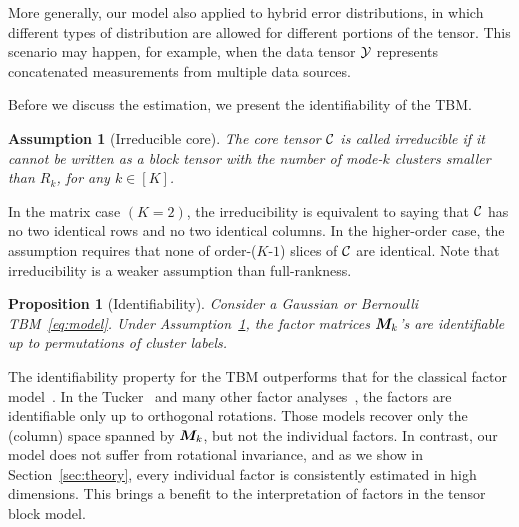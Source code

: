 \documentclass{article}
\newtheorem{prop}{Proposition}
\newtheorem{ass}{Assumption}
\begin{document}
More generally, our model also applied to hybrid error distributions, in which different types of distribution are allowed for different portions of the tensor. This scenario may happen, for example, when the data tensor $\mathcal{Y}$ represents concatenated measurements from multiple data sources. 

Before we discuss the estimation, we present the identifiability of the TBM. 

\begin{ass}[Irreducible core]\label{ass:core}
The core tensor $\mathcal{C}$ is called irreducible if it cannot be written as a block tensor with the number of mode-$k$ clusters smaller than $R_k$, for any $k\in[K]$. 
\end{ass}

In the matrix case $(K=2)$, the irreducibility is equivalent to saying that $\mathcal{C}$ has no two identical rows and no two identical columns. In the higher-order case, the assumption requires that none of order-($K$-$1$) slices of $\mathcal{C}$ are identical. Note that irreducibility is a weaker assumption than full-rankness. 

\begin{prop}[Identifiability]\label{prop:factors}
Consider a Gaussian or Bernoulli TBM~\eqref{eq:model}. Under Assumption~\ref{ass:core}, the factor matrices $\bm M_k$'s are identifiable up to permutations of cluster labels. 
\end{prop}

The identifiability property for the TBM outperforms that for the classical factor model~\cite{darton1980rotation,abdi2003factor}. In the Tucker~\cite{zhang2018tensor,kolda2009tensor} and many other factor analyses~\cite{darton1980rotation,abdi2003factor}, the factors are identifiable only up to orthogonal rotations. Those models recover only the (column) space spanned by $\bm M_k$, but not the individual factors. In contrast, our model does not suffer from rotational invariance, and as we show in Section~\ref{sec:theory}, every individual factor is consistently estimated in high dimensions. This brings a benefit to the interpretation of factors in the tensor block model.  
\end{document}
